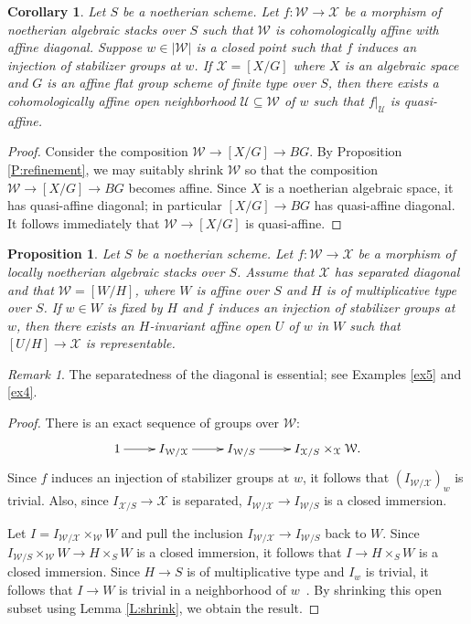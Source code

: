 \documentclass[a4paper]{amsart}
\theoremstyle{plain}
\newtheorem{corollary}[theorem]{Corollary}
\newtheorem{proposition}[theorem]{Proposition}
\theoremstyle{definition}
\theoremstyle{remark}
\newtheorem{remark}[theorem]{Remark}
\numberwithin{equation}{section}
\newcommand\cW{\mathcal{W}}
\newcommand\cU{\mathcal{U}}
\newcommand\cX{\mathcal{X}}
\newcommand\co{\colon}
\begin{document}
\begin{corollary} \label{C:refinement:quot_stack} 
  Let $S$ be a noetherian scheme.  Let
  $f \co \cW \to \cX$ be a morphism of noetherian algebraic stacks over $S$
  such that $\cW$ is cohomologically affine with affine
  diagonal. Suppose $w \in |\cW|$ is a closed point such that $f$
  induces an injection of stabilizer groups at $w$.  If $\cX=[X/G]$
  where $X$ is an algebraic space and $G$ is an affine flat group
  scheme of finite type over $S$, then there exists a cohomologically affine open neighborhood
  $\cU \subseteq \cW$ of $w$ such that $f|_{\cU}$ is quasi-affine.
\end{corollary}
\begin{proof}
  Consider the composition $\cW \to [X/G] \to BG$. By Proposition
  \ref{P:refinement}, we may suitably shrink $\cW$ so that the
  composition $\cW \to [X/G] \to BG$ becomes affine. Since $X$ is a
  noetherian algebraic space, it has quasi-affine diagonal; in
  particular $[X/G] \to BG$ has quasi-affine diagonal. It follows
  immediately that $\cW \to [X/G]$ is quasi-affine.
\end{proof}
\begin{proposition}\label{P:rep_diagonalizable}
  Let $S$ be a noetherian scheme. Let $f\colon \cW \to \cX$ be a morphism of 
  locally noetherian algebraic stacks over $S$. Assume that $\cX$ has separated
  diagonal and that $\cW = [W/H]$, where $W$ is affine over $S$ and $H$ is 
  of multiplicative type over $S$. If $w\in W$ is fixed by $H$ and $f$ induces an injection 
  of stabilizer groups at $w$, then there exists an $H$-invariant affine open $U$ of $w$ in 
  $W$ such that $[U/H] \to \cX$ is representable.
\end{proposition}

\begin{remark}
The separatedness of the diagonal is essential; see Examples \ref{ex5} and \ref{ex4}.
\end{remark}
\begin{proof}
  There is an exact sequence of groups over $\cW$:
  \[
  \xymatrix{1 \ar[r] & I_{\cW/\cX} \ar[r] & I_{\cW/S} \ar[r] & I_{\cX/S}\times_{\cX} \cW.}
  \]
  Since $f$ induces an injection of stabilizer groups at $w$, it follows that
  $(I_{\cW/\cX})_w$ is trivial. Also, since $I_{\cX/S} \to \cX$ is separated,
  $I_{\cW/\cX} \to I_{\cW/S}$ is a closed immersion.

  Let $I=I_{\cW/\cX}\times_{\cW} W$ and pull the inclusion 
  $I_{\cW/\cX} \to I_{\cW/S}$ back to $W$.  Since $I_{\cW/S}\times_{\cW} W \to H\times_S W$ 
  is a closed immersion, it follows that $I \to H\times_S W$ is a closed immersion. Since $H\to S$ is of multiplicative type and $I_w$ is trivial,
  it follows that $I\to W$ is trivial in a neighborhood of $w$~\cite[Exp.~IX, Cor.~6.5]{sga3ii}. By shrinking 
  this open subset using Lemma \ref{L:shrink}, we obtain the result.  
\end{proof}
\end{document}
